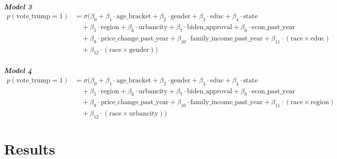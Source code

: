 \documentclass[letter]{article}
\begin{document}
\\
\textit{\textbf{Model 3}}
\begin{align*}
p(\text{vote\_trump} = 1) &= \sigma \Big(
  \beta_0
  + \beta_1 \cdot \text{age\_bracket}
  + \beta_2 \cdot \text{gender}
  + \beta_3 \cdot \text{educ}
  + \beta_4 \cdot \text{state} \\
  &\quad + \beta_5 \cdot \text{region}
  + \beta_6 \cdot \text{urbancity}
  + \beta_7 \cdot \text{biden\_approval}
  + \beta_8 \cdot \text{econ\_past\_year} \\
  &\quad + \beta_9 \cdot \text{price\_change\_past\_year}
  + \beta_{10} \cdot \text{family\_income\_past\_year}
  + \beta_{11} \cdot (\text{race} \times \text{educ}) \\
  &\quad + \beta_{12} \cdot (\text{race} \times \text{gender})
\Big)
\end{align*}
\\
\textit{\textbf{Model 4}}
\begin{align*}
p(\text{vote\_trump} = 1) &= \sigma\Big(
  \beta_0
  + \beta_1 \cdot \text{age\_bracket}
  + \beta_2 \cdot \text{gender}
  + \beta_3 \cdot \text{educ}
  + \beta_4 \cdot \text{state} \\
  &\quad + \beta_5 \cdot \text{region}
  + \beta_6 \cdot \text{urbancity}
  + \beta_7 \cdot \text{biden\_approval}
  + \beta_8 \cdot \text{econ\_past\_year} \\
  &\quad + \beta_9 \cdot \text{price\_change\_past\_year}
  + \beta_{10} \cdot \text{family\_income\_past\_year}
  + \beta_{11} \cdot (\text{race} \times \text{region}) \\
  &\quad + \beta_{12} \cdot (\text{race} \times \text{urbancity})
\Big)
\end{align*}
\section{Results} \label{sec:results}
\end{document}
